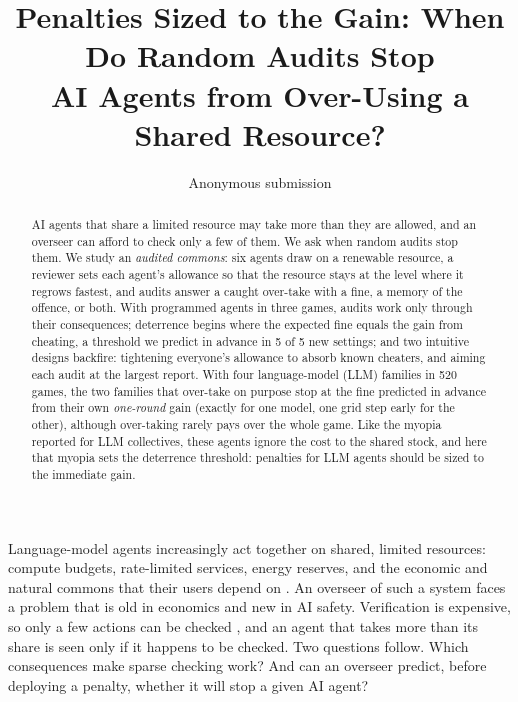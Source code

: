 \documentclass[10pt,twocolumn,letterpaper]{article}
\title{Penalties Sized to the Gain: When Do Random Audits Stop\\AI Agents from Over-Using a Shared Resource?}
\author{Anonymous submission}
\date{}
\makeatletter
\renewcommand\section{\@startsection{section}{1}{\z@}{-2.2ex plus -0.5ex minus -.2ex}{1.1ex plus .2ex}{\centering\normalfont\large\bfseries}}
\makeatother
\begin{document}
\maketitle
\thispagestyle{empty}

\begin{abstract}
AI agents that share a limited resource may take more than they are allowed, and an overseer can afford to check only a few of them. We ask when random audits stop them. We study an \emph{audited commons}: six agents draw on a renewable resource, a reviewer sets each agent's allowance so that the resource stays at the level where it regrows fastest, and audits answer a caught over-take with a fine, a memory of the offence, or both. With programmed agents in three games, audits work only through their consequences; deterrence begins where the expected fine equals the gain from cheating, a threshold we predict in advance in 5 of 5 new settings; and two intuitive designs backfire: tightening everyone's allowance to absorb known cheaters, and aiming each audit at the largest report. With four language-model (LLM) families in 520 games, the two families that over-take on purpose stop at the fine predicted in advance from their own \emph{one-round} gain (exactly for one model, one grid step early for the other), although over-taking rarely pays over the whole game. Like the myopia reported for LLM collectives, these agents ignore the cost to the shared stock, and here that myopia sets the deterrence threshold: penalties for LLM agents should be sized to the immediate gain.
\end{abstract}

\section{Introduction}

Language-model agents increasingly act together on shared, limited resources: compute budgets, rate-limited services, energy reserves, and the economic and natural commons that their users depend on \citep{piatti2024cooperate,bracale2026draining}. An overseer of such a system faces a problem that is old in economics and new in AI safety. Verification is expensive, so only a few actions can be checked \citep{amodei2016concrete,greenblatt2024control}, and an agent that takes more than its share is seen only if it happens to be checked. Two questions follow. Which consequences make sparse checking work? And can an overseer predict, before deploying a penalty, whether it will stop a given AI agent?
\end{document}
